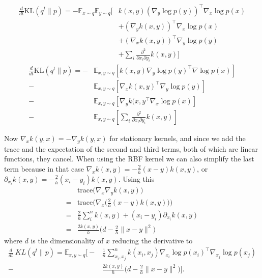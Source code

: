 \documentclass{article}
\begin{document}
    \begin{align}
        \frac{d}{dt} \text{KL}( q^t \| p ) = - \mathbb{E}_{x\sim q} \mathbb{E}_{y \sim q} \big[
            & k(x,y) (\nabla_y \log p(y))^\top \nabla_x \log p(x) \\
            &+ (\nabla_y k(x,y) )^\top \nabla_x \log p(x) \\
            &+ (\nabla_x k(x,y) )^\top \nabla_y \log p(y) \\
            &+ \sum_i \frac{ \partial^2 }{ \partial x_i \partial y_i } k(x,y) \big]
    \end{align}
    \begin{align}
        \frac{d}{dt} \text{KL} ( q^t \| p ) =
        -& \mathbb{E}_{x,y\sim q} \left[ k(x,y) \nabla_y \log p(y)^\top \nabla \log p(x) \right] \\ 
        -& \mathbb{E}_{x,y\sim q} \left[ \nabla_x k(x,y)^\top \nabla_y \log p(y) \right] \\ 
        -& \mathbb{E}_{x,y\sim q} \left[ \nabla_y k(x,y^\top \nabla_x \log p(x) \right] \\ 
        -& \mathbb{E}_{x,y\sim q} \left[ \sum_i \frac{ \partial^2 }{ \partial x_i \partial y_i } k(x,y) \right]
    \end{align}

    Now $\nabla_x k(y,x) = - \nabla_y k(y,x)$ for stationary kernels, and since we add the trace and the expectation of 
    the second and third terms, both of which are linear functions, they cancel.
    When using the RBF kernel we can also simplify the last term because in that case $\nabla_x k(x,y) = -\frac{2}{h} (x-y) k(x,y) $,
    or $\partial_{x_i} k(x,y) = -\frac{2}{h} (x_i - y_i) k(x,y)$. Using this 
    \begin{align}
        &\text{trace} \Big( \nabla_x \nabla_y k(x,y) \Big) \\
        = &\text{trace} \Big( \nabla_x \big( \frac{2}{h} (x-y)k(x,y) \big) \Big) \\
        = &\frac{2}{h} \sum_{i}^{n} k(x,y) + (x_i - y_i) \partial_{x_i} k(x,y) \\
        = & \frac{2k(x,y)}{h}\Big( d - \frac{2}{h}\|x-y\|^2 \Big)
    \end{align}
    where $d$ is the dimensionality of $x$
    reducing the derivative to
    \begin{align}
        \frac{d}{dt}\ KL( q^t \| p ) =\mathbb{E}_{x,y\sim q} \Bigg[ -& \frac{1}{n}\sum_{x_i,x_j}^n  k(x_i,x_j) \nabla_{x_i} \log p(x_i)^\top \nabla_{x_j} \log p(x_j)  \\ 
        -& \frac{2k(x,y)}{h}\Big( d - \frac{2}{h}\|x-y\|^2 \Big)\Bigg].
    \end{align}
\end{document}
